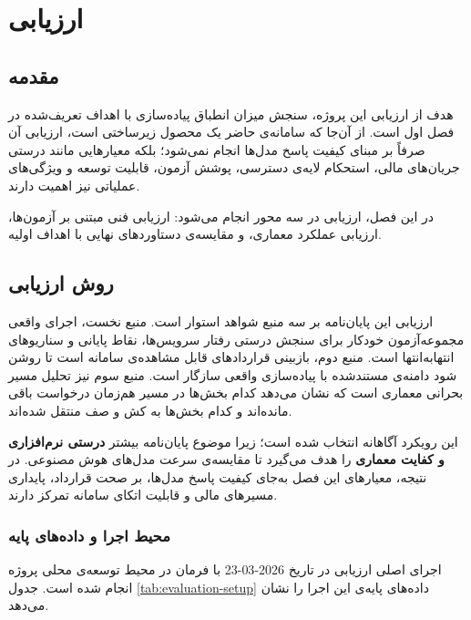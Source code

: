 \chapter{ارزیابی}
\label{ch:evaluation}

\section{مقدمه}

هدف از ارزیابی این پروژه، سنجش میزان انطباق پیاده‌سازی با اهداف تعریف‌شده
در فصل اول است. از آن‌جا که سامانه‌ی حاضر یک محصول زیرساختی است، ارزیابی
آن صرفاً بر مبنای کیفیت پاسخ مدل‌ها انجام نمی‌شود؛ بلکه معیارهایی مانند
درستی جریان‌های مالی، استحکام لایه‌ی دسترسی، پوشش آزمون، قابلیت توسعه و
ویژگی‌های عملیاتی نیز اهمیت دارند.

در این فصل، ارزیابی در سه محور انجام می‌شود: ارزیابی فنی مبتنی بر آزمون‌ها،
ارزیابی عملکرد معماری، و مقایسه‌ی دستاوردهای نهایی با اهداف اولیه.

\section{روش ارزیابی}

ارزیابی این پایان‌نامه بر سه منبع شواهد استوار است. منبع نخست، اجرای واقعی
مجموعه‌آزمون خودکار برای سنجش درستی رفتار سرویس‌ها، نقاط پایانی و
سناریوهای انتهابه‌انتها است. منبع دوم، بازبینی قراردادهای قابل مشاهده‌ی
سامانه است تا روشن شود دامنه‌ی  مستندشده با پیاده‌سازی واقعی
سازگار است. منبع سوم نیز تحلیل مسیر بحرانی معماری است که نشان می‌دهد کدام
بخش‌ها در مسیر هم‌زمان درخواست باقی مانده‌اند و کدام بخش‌ها به کش و صف
منتقل شده‌اند.

این رویکرد آگاهانه انتخاب شده است؛ زیرا موضوع پایان‌نامه بیشتر
\textbf{درستی نرم‌افزاری و کفایت معماری} را هدف می‌گیرد تا مقایسه‌ی
سرعت مدل‌های هوش مصنوعی. در نتیجه، معیارهای این فصل به‌جای کیفیت پاسخ
مدل‌ها، بر صحت قرارداد، پایداری مسیرهای مالی و قابلیت اتکای سامانه
تمرکز دارند.

\subsection{محیط اجرا و داده‌های پایه}

اجرای اصلی ارزیابی در تاریخ 2026-03-23 با فرمان 
در محیط توسعه‌ی محلی پروژه انجام شده است. جدول
\ref{tab:evaluation-setup} داده‌های پایه‌ی این اجرا را نشان می‌دهد.

